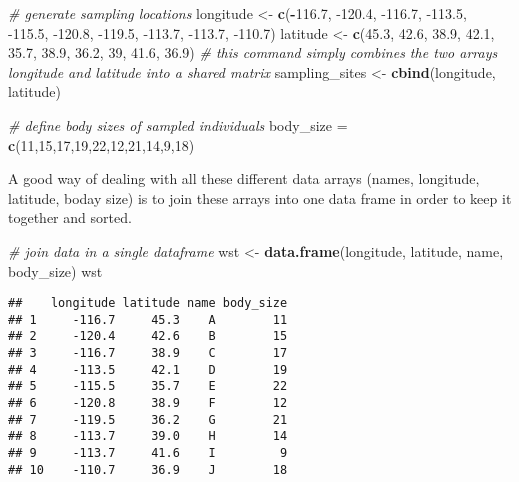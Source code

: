 \documentclass[]{article}
\newenvironment{Shaded}{\begin{snugshade}}{\end{snugshade}}
\newcommand{\CommentTok}[1]{\textcolor[rgb]{0.56,0.35,0.01}{\textit{#1}}}
\newcommand{\DecValTok}[1]{\textcolor[rgb]{0.00,0.00,0.81}{#1}}
\newcommand{\FloatTok}[1]{\textcolor[rgb]{0.00,0.00,0.81}{#1}}
\newcommand{\KeywordTok}[1]{\textcolor[rgb]{0.13,0.29,0.53}{\textbf{#1}}}
\newcommand{\NormalTok}[1]{#1}
\newcommand{\OperatorTok}[1]{\textcolor[rgb]{0.81,0.36,0.00}{\textbf{#1}}}
\newcommand{\StringTok}[1]{\textcolor[rgb]{0.31,0.60,0.02}{#1}}
\begin{document}
\begin{Shaded}
\begin{Highlighting}[]
\CommentTok{# generate sampling locations}
\NormalTok{longitude <-}\StringTok{ }\KeywordTok{c}\NormalTok{(}\OperatorTok{-}\FloatTok{116.7}\NormalTok{, }\FloatTok{-120.4}\NormalTok{, }\FloatTok{-116.7}\NormalTok{, }\FloatTok{-113.5}\NormalTok{, }\FloatTok{-115.5}\NormalTok{,}
               \FloatTok{-120.8}\NormalTok{, }\FloatTok{-119.5}\NormalTok{, }\FloatTok{-113.7}\NormalTok{, }\FloatTok{-113.7}\NormalTok{, }\FloatTok{-110.7}\NormalTok{)}
\NormalTok{latitude <-}\StringTok{ }\KeywordTok{c}\NormalTok{(}\FloatTok{45.3}\NormalTok{, }\FloatTok{42.6}\NormalTok{, }\FloatTok{38.9}\NormalTok{, }\FloatTok{42.1}\NormalTok{, }\FloatTok{35.7}\NormalTok{, }\FloatTok{38.9}\NormalTok{,}
              \FloatTok{36.2}\NormalTok{, }\DecValTok{39}\NormalTok{, }\FloatTok{41.6}\NormalTok{, }\FloatTok{36.9}\NormalTok{)}
\CommentTok{# this command simply combines the two arrays longitude and latitude into a shared matrix}
\NormalTok{sampling_sites <-}\StringTok{ }\KeywordTok{cbind}\NormalTok{(longitude, latitude)}

\CommentTok{# define body sizes of sampled individuals}
\NormalTok{body_size =}\StringTok{ }\KeywordTok{c}\NormalTok{(}\DecValTok{11}\NormalTok{,}\DecValTok{15}\NormalTok{,}\DecValTok{17}\NormalTok{,}\DecValTok{19}\NormalTok{,}\DecValTok{22}\NormalTok{,}\DecValTok{12}\NormalTok{,}\DecValTok{21}\NormalTok{,}\DecValTok{14}\NormalTok{,}\DecValTok{9}\NormalTok{,}\DecValTok{18}\NormalTok{)}
\end{Highlighting}
\end{Shaded}

A good way of dealing with all these different data arrays (names,
longitude, latitude, boday size) is to join these arrays into one data
frame in order to keep it together and sorted.

\begin{Shaded}
\begin{Highlighting}[]
\CommentTok{# join data in a single dataframe}
\NormalTok{wst <-}\StringTok{ }\KeywordTok{data.frame}\NormalTok{(longitude, latitude, name, body_size)}
\NormalTok{wst}
\end{Highlighting}
\end{Shaded}

\begin{verbatim}
##    longitude latitude name body_size
## 1     -116.7     45.3    A        11
## 2     -120.4     42.6    B        15
## 3     -116.7     38.9    C        17
## 4     -113.5     42.1    D        19
## 5     -115.5     35.7    E        22
## 6     -120.8     38.9    F        12
## 7     -119.5     36.2    G        21
## 8     -113.7     39.0    H        14
## 9     -113.7     41.6    I         9
## 10    -110.7     36.9    J        18
\end{verbatim}
\end{document}

